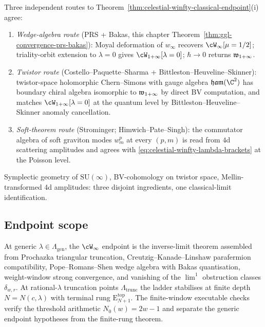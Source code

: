 \begin{remark}
\label{rem:celestial-winfty-iv-triangle}
Three independent routes to
Theorem~\ref{thm:celestial-winfty-classical-endpoint}(i) agree:
\begin{enumerate}[label=\textup{(\alph*)}]
\item \emph{Wedge-algebra route} (PRS + Bakas, this chapter
Theorem~\ref{thm:ggl-convergence-prs-bakas}): Moyal deformation
of $w_\infty$ recovers $\cW_\infty[\mu=1/2]$; triality-orbit
extension to $\lambda = 0$ gives $\cW_{1+\infty}[\lambda=0]$;
$\hbar \to 0$ returns $\mathfrak{w}_{1+\infty}$.
\item \emph{Twistor route} (Costello--Paquette--Sharma +
Bittleston--Heuveline--Skinner): twistor-space holomorphic
Chern--Simons with gauge algebra $\mathfrak{ham}(\C^2)$ has
boundary chiral algebra isomorphic to $\mathfrak{w}_{1+\infty}$ by direct BV
computation, and matches $\cW_{1+\infty}[\lambda=0]$ at the
quantum level by Bittleston--Heuveline--Skinner anomaly
cancellation.
\item \emph{Soft-theorem route} (Strominger; Himwich--Pate--Singh):
the commutator algebra of soft graviton modes $w^p_m$ at every
$(p,m)$ is read from $4$d scattering amplitudes and agrees with
\eqref{eq:celestial-winfty-lambda-brackets} at the Poisson level.
\end{enumerate}
Symplectic geometry of $\mathrm{SU}(\infty)$, BV-cohomology on
twistor space, Mellin-transformed 4d amplitudes: three disjoint
ingredients, one classical-limit identification.
\end{remark}

\subsection{Endpoint scope}
\label{subsec:headline-inscription}

At generic $\lambda \in \Lambda_{\mathrm{gen}}$, the $\cW_\infty$
endpoint is the inverse-limit theorem assembled from Prochazka
triangular truncation, Creutzig--Kanade--Linshaw parafermion
compatibility, Pope--Romans--Shen wedge algebra with Bakas
quantisation, weight-window strong convergence, and vanishing of
the \(\lim^1\) obstruction classes \(\delta_{w,r}\). At
rational-$\lambda$ truncation points $\Lambda_{\mathrm{trunc}}$
the ladder stabilises at finite depth $N = N(c, \lambda)$ with
terminal rung $\mathrm{E}_{N+1}^{\mathrm{top}}$. The finite-window
executable checks verify the threshold arithmetic
\(N_0(w)=2w-1\) and separate the generic endpoint hypotheses
from the finite-rung theorem.

